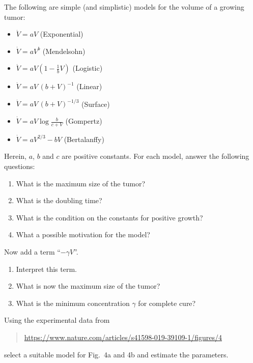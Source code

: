 \documentclass[12pt,a4paper]{article}
\begin{document}
    The following are simple (and simplistic) models for 
    the volume of a growing tumor:
    \begin{itemize}
    \item 
        $\dot{V} = a V$
        \hfill
        (Exponential)
    \item
        $\dot{V} = a V^b$
        \hfill
        (Mendelsohn)
    \item
        $\dot{V} = a V (1 - \frac1b V)$
        \hfill
        (Logistic)
    \item
        $\dot{V} = a V \, (b + V)^{-1}$
        \hfill
        (Linear)
    \item
        $\dot{V} = a V \, (b + V)^{-1/3}$
        \hfill
        (Surface)
    \item
        $\dot{V} = a V \log \frac{b}{c + V}$
        \hfill
        (Gompertz)
    \item
        $\dot{V} = a V^{2/3} - b V$
        \hfill
        (Bertalanffy)
    \end{itemize}
    Herein, $a$, $b$ and $c$ are positive constants.
    For each model, answer the following questions:
    \begin{enumerate}
    \item 
        What is the maximum size of the tumor?
    \item
        What is the doubling time?
    \item
        What is the condition on the constants for positive growth?
    \item
        What a possible motivation for the model?
    \end{enumerate}
    
    
    Now add a term ``$-\gamma V$''.
    \begin{enumerate}[resume]
    \item
        Interpret this term.
    \item
        What is now the maximum size of the tumor?
    \item
        What is the minimum concentration $\gamma$ for complete cure?
    \end{enumerate}
    
    
    Using the experimental data from
    \begin{quote}
        \url{https://www.nature.com/articles/s41598-019-39109-1/figures/4}
    \end{quote}
    select a suitable model for Fig.~4a and 4b
    and estimate the parameters.
\end{document}
